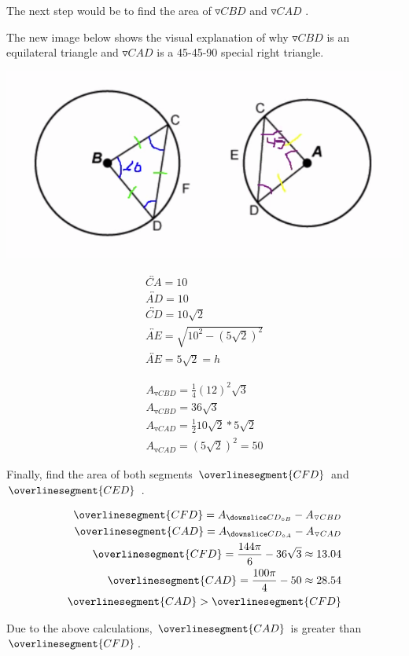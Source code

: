 \documentclass{article}
\begin{document}
The next step would be to find the area of $ \triangledown{CBD} $ and $ \triangledown{CAD} $ .
\par
The new image below shows the visual explanation of why $\triangledown{CBD}$ is an equilateral triangle and $\triangledown{CAD}$ is a 45-45-90 special right triangle.
\begin{center}
  \includegraphics[width=1.1\columnwidth]{q38p2.png}
\end{center}

\par

\begin{align}
  \overleftrightarrow{CA} = 10 \\
  \overleftrightarrow{AD} = 10 \\
  \overleftrightarrow{CD} = 10 \sqrt{2} \\
  \overleftrightarrow{AE} = \sqrt{10^2 - (5\sqrt{2})^2} \\
  \overleftrightarrow{AE} = 5 \sqrt{2} = h
\end{align}
\par
\begin{align}
  A_{\triangledown{CBD}} = \frac{1}{4}(12)^2 \sqrt{3} \\
  A_{\triangledown{CBD}} = 36 \sqrt{3} \\
  A_{\triangledown{CAD}} =  \frac{1}{2} 10\sqrt{2} * 5\sqrt{2} \\
  A_{\triangledown{CAD}} = (5 \sqrt{2})^2 = 50
\end{align}

Finally, find the area of both segments $\overlinesegment{CFD}$ and $\overlinesegment{CED}$ .

\begin{align}
  \overlinesegment{CFD} = A_{\downslice CD_{\circ B}} - A_{\triangledown{CBD}} \\
  \overlinesegment{CAD} = A_{\downslice CD_{\circ A}} - A_{\triangledown{CAD}} \\
  \overlinesegment{CFD} = \frac{144 \pi}{6} - 36 \sqrt{3} \approx 13.04 \\
  \overlinesegment{CAD} = \frac{100 \pi}{4} - 50 \approx 28.54 \\
  \overlinesegment{CAD} > \overlinesegment{CFD}
\end{align}

Due to the above calculations, $\overlinesegment{CAD}$ is greater than $\overlinesegment{CFD}$.
\end{document}
